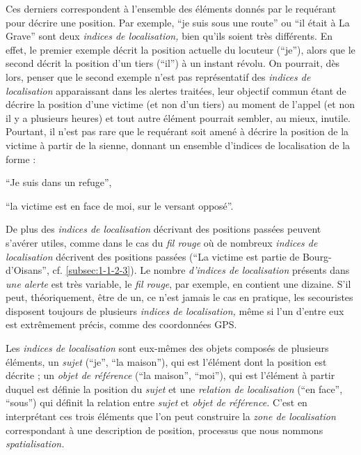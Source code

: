 Ces derniers correspondent à l'ensemble des éléments donnés par le
requérant pour décrire une position. Par exemple, \enquote{je suis
  sous une route} ou \enquote{il était à La Grave} sont deux
\emph{indices de localisation,} bien qu'ils soient très différents. En
effet, le premier exemple décrit la position actuelle du locuteur
(\enquote{je}), alors que le second décrit la position d'un tiers
(\enquote{il}) à un instant révolu. On pourrait, dès lors, penser que
le second exemple n'est pas représentatif des \emph{indices de
  localisation} apparaissant dans les alertes traitées, leur objectif
commun étant de décrire la position d'une victime (et non d'un tiers)
au moment de l'appel (et non il y a plusieurs heures) et tout autre
élément pourrait sembler, au mieux, inutile. Pourtant, il n'est pas
rare que le requérant soit amené à décrire la position de la victime à
partir de la sienne, donnant un ensemble d'indices de localisation de
la forme :
%
\begin{enumerate*}[label=(\alph*)]
\item \enquote{Je suis dans un refuge},
\item \enquote{la victime est en face de moi, sur le versant opposé}.
\end{enumerate*}
% 
De plus des \emph{indices de localisation} décrivant des positions
passées peuvent s'avérer utiles, comme dans le cas du \emph{fil rouge}
où de nombreux \emph{indices de localisation} décrivent des positions
passées (\eg \enquote{La victime est partie de Bourg-d'Oisans},
cf. \autoref{subsec:1-1-2-3}). Le nombre \emph{d'indices de
  localisation} présents dans \emph{une alerte} est très variable, le
\emph{fil rouge}, par exemple, en contient une dizaine. S'il peut,
théoriquement, être de un, ce n'est jamais le cas en pratique, les
secouristes disposent toujours de plusieurs \emph{indices de
  localisation,} même si l'un d'entre eux est extrêmement précis,
comme des coordonnées GPS.
 
Les \emph{indices de localisation} sont eux-mêmes des objets composés
de plusieurs éléments, un \emph{sujet} (\enquote{je}, \enquote{la
  maison}), qui est l'élément dont la position est décrite ; un
\emph{objet de référence} (\enquote{la maison}, \enquote{moi}), qui
est l'élément à partir duquel est définie la position du \emph{sujet}
et une \emph{relation de localisation} (\enquote{en face},
\enquote{sous}) qui définit la relation entre \emph{sujet} et
\emph{objet de référence.} C'est en interprétant ces trois éléments
que l'on peut construire la \emph{zone de localisation} correspondant
à une description de position, processus que nous nommons
\emph{spatialisation.}

